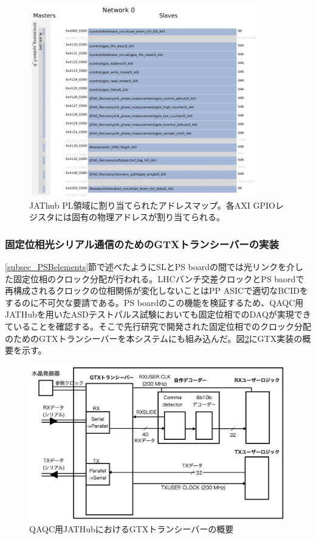 \begin{figure} 
\centering
\includegraphics[width=10cm]{fig/QAQC/JATHubaddress.png}
\caption[アドレスマップ]{JAThub PL領域に割り当てられたアドレスマップ。各AXI GPIOレジスタには固有の物理アドレスが割り当てられる。}
\label{JATHuaddress}
\end{figure}

\subsubsection{固定位相光シリアル通信のためのGTXトランシーバーの実装}
\label{subsubsec_gtx}
\ref{subsec_PSBelements}節で述べたようにSLとPS boardの間では光リンクを介した固定位相のクロック分配が行われる。LHCバンチ交差クロックとPS baordで再構成されるクロックの位相関係が変化しないことはPP ASICで適切なBCIDをするのに不可欠な要請である。PS boardのこの機能を検証するため、QAQC用JATHubを用いたASDテストパルス試験においても固定位相でのDAQが実現できていることを確認する。そこで先行研究で開発された固定位相でのクロック分配のためのGTXトランシーバーを本システムにも組み込んだ。図\ref{JATHubgtx}にGTX実装の概要を示す。
\baselineskip

\begin{figure} 
\centering
\includegraphics[width=16cm]{fig/QAQC/JATHubgtx.png}
\caption[QAQC用JATHubにおけるGTXトランシーバーの概要]{QAQC用JATHubにおけるGTXトランシーバーの概要}
\label{JATHubgtx}
\end{figure}


